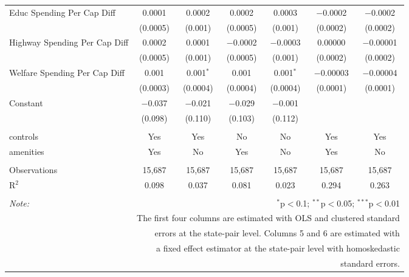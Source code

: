 \begin{table}[!htbp]
\begin{tabular}{@{\extracolsep{5pt}}lcccccc}
  Educ Spending Per Cap Diff & 0.0001 & 0.0002 & 0.0002 & 0.0003 & $-$0.0002 & $-$0.0002 \\ 
  & (0.0005) & (0.001) & (0.0005) & (0.001) & (0.0002) & (0.0002) \\ 
  Highway Spending Per Cap Diff & 0.0002 & 0.0001 & $-$0.0002 & $-$0.0003 & 0.00000 & $-$0.00001 \\ 
  & (0.0005) & (0.001) & (0.0005) & (0.001) & (0.0002) & (0.0002) \\ 
  Welfare Spending Per Cap Diff & 0.001 & 0.001$^{*}$ & 0.001 & 0.001$^{*}$ & $-$0.00003 & $-$0.00004 \\ 
  & (0.0003) & (0.0004) & (0.0004) & (0.0004) & (0.0001) & (0.0001) \\ 
  Constant & $-$0.037 & $-$0.021 & $-$0.029 & $-$0.001 &  &  \\ 
  & (0.098) & (0.110) & (0.103) & (0.112) &  &  \\ 
 \hline \\[-1.8ex] 
controls & Yes & Yes & No & No & Yes & Yes \\ 
amenities & Yes & No & Yes & No & Yes & No \\ 
\hline \\[-1.8ex] 
Observations & 15,687 & 15,687 & 15,687 & 15,687 & 15,687 & 15,687 \\ 
R$^{2}$ & 0.098 & 0.037 & 0.081 & 0.023 & 0.294 & 0.263 \\ 
\hline 
\hline \\[-1.8ex] 
\textit{Note:}  & \multicolumn{6}{r}{$^{*}$p$<$0.1; $^{**}$p$<$0.05; $^{***}$p$<$0.01} \\ 
 & \multicolumn{6}{r}{The first four columns are estimated with OLS and clustered standard} \\ 
 & \multicolumn{6}{r}{ errors at the state-pair level. Columns 5 and 6 are estimated with} \\ 
 & \multicolumn{6}{r}{a fixed effect estimator at the state-pair level with homoskedastic} \\ 
 & \multicolumn{6}{r}{standard errors.} \\ 
\end{tabular} 
\end{table} 
